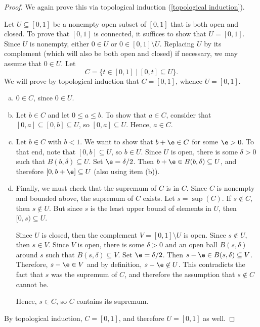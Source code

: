 \documentclass[noname]{notes}
\begin{document}
\begin{proof}
	We again prove this via topological induction (\cref{topological induction}).
	
	Let $U \subseteq [0,1]$ be a nonempty open subset of $[0,1]$ that is both open and closed. To prove that $[0,1]$ is connected, it suffices to show that $U = [0,1]$. Since $U$ is nonempty, either $0 \in U$ or $0 \in [0,1] \setminus U$. Replacing $U$ by its complement (which will also be both open and closed) if necessary, we may assume that $0 \in U$. Let 
	\[
		C = \Big\{ t \in [0,1] \mid [0,t] \subseteq U \Big\}. 
	\]
	We will prove by topological induction that $C = [0,1]$, whence $U = [0,1]$. 
	\begin{enumerate}[(a)]
		\item $0 \in C$, since $0 \in U$. 
		\item Let $b \in C$ and let $0 \leq a \leq b$. To show that $a \in C$, consider that $[0,a] \subseteq [0,b] \subseteq U$, so $[0,a] \subseteq U$. Hence, $a \in C$. 
		\item Let $b \in C$ with $b < 1$. We want to show that $b + \e \in C$ for some $\e > 0$. To that end, note that $[0,b] \subseteq U$, so $b \in U$. Since $U$ is open, there is some $\delta > 0$ such that $B(b,\delta) \subseteq U$. Set $\e = \delta/2$. Then $b + \e \in B(b,\delta) \subseteq U$, and therefore $[0,b + \e] \subseteq U$ (also using item (b)). 
		\item Finally, we must check that the supremum of $C$ is in $C$\footnotemark{}. Since $C$ is nonempty and bounded above, the supremum of $C$ exists. Let $s = \sup(C)$. If $s \not \in C$, then $s \not \in U$. But since $s$ is the least upper bound of elements in $U$, then $[0,s) \subseteq U$. 
		
		Since $U$ is closed, then the complement $V = [0,1] \setminus U$ is open. Since $s \not \in U$, then $s \in V$. Since $V$ is open, there is some $\delta > 0$ and an open ball $B(s,\delta)$ around $s$ such that $B(s, \delta) \subseteq V$. Set $\e = \delta / 2$. Then $s - \e \in B(s,\delta) \subseteq V$. Therefore, $s - \e \in V$ and by definition, $s - \e \not \in U$. This contradicts the fact that $s$ was the supremum of $C$, and therefore the assumption that $s \not \in C$ cannot be. 
		
		Hence, $s \in C$, so $C$ contains its supremum. 
	\end{enumerate}	
	
	By topological induction, $C = [0,1]$, and therefore $U = [0,1]$ as well. 
\end{proof}
\end{document}
